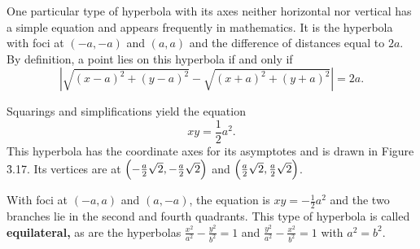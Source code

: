 One particular type of hyperbola with its axes neither horizontal nor vertical has a simple equation and appears frequently in mathematics. It is the hyperbola with foci at $(-a, -a)$ and $(a, a)$ and the difference of distances equal to $2a$. By definition, a point lies on this hyperbola if and only if
$$
| \sqrt{(x - a)^2 + (y - a)^2} -\sqrt{(x + a)^2 + (y + a)^2} | = 2a.
$$

\noindent Squarings and simplifications yield the equation
$$
xy = \frac{1}{2}a^2 .
$$
This hyperbola has the coordinate axes for its asymptotes and is drawn in Figure \f{3.17}. Its vertices are at $\Bigl( -\frac{a}{2}\sqrt{2}, -\frac{a}{2}\sqrt{2} \Bigr)$ and $\Bigl(\frac{a}{2}\sqrt{2}, \frac{a}{2}\sqrt{2} \Bigr)$.   
 

\noindent With foci at $(-a, a)$ and $(a, -a)$, the equation is $xy = - \frac{1}{2}a^2$ and the two branches lie in the second and fourth quadrants. This type of hyperbola is called \textbf{equilateral,} as are the hyperbolas $\frac{x^2}{a^2} - \frac{y^2}{b^2} = 1$ and $\frac{y^2}{a^2} - \frac{x^2}{b^2} = 1$ with $a^2 = b^2$.

